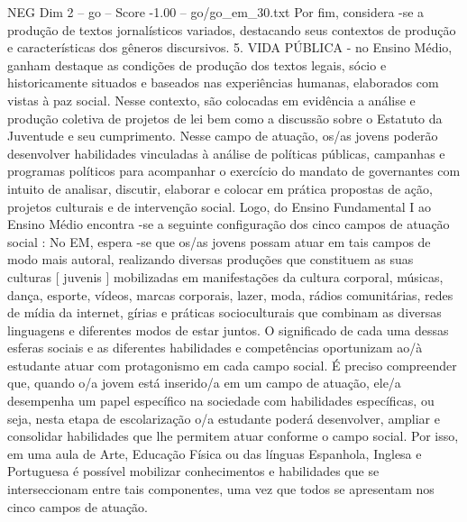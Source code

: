 \begin{textsample}{NEG Dim 2 – go – Score -1.00 – go/go\_em\_30.txt}
Por fim, considera -se a produção de textos jornalísticos variados, destacando seus contextos de produção e características dos gêneros discursivos. 5.
VIDA PÚBLICA - no Ensino Médio, ganham destaque as condições de produção dos textos legais, sócio e historicamente situados e baseados nas experiências humanas, elaborados com vistas à paz social.
Nesse contexto, são colocadas em evidência a análise e produção coletiva de projetos de lei bem como a discussão sobre o Estatuto da Juventude e seu cumprimento.
Nesse campo de atuação, os/as jovens poderão desenvolver habilidades vinculadas à análise de políticas públicas, campanhas e programas políticos para acompanhar o exercício do mandato de governantes com intuito de analisar, discutir, elaborar e colocar em prática propostas de ação, projetos culturais e de intervenção social.
Logo, do Ensino Fundamental I ao Ensino Médio encontra -se a seguinte configuração dos cinco campos de atuação social : No EM, espera -se que os/as jovens possam atuar em tais campos de modo mais autoral, realizando diversas produções que constituem as suas culturas [ juvenis ] mobilizadas em manifestações da cultura corporal, músicas, dança, esporte, vídeos, marcas corporais, lazer, moda, rádios comunitárias, redes de mídia da internet, gírias e práticas socioculturais que combinam as diversas linguagens e diferentes modos de estar juntos.
O significado de cada uma dessas esferas sociais e as diferentes habilidades e competências oportunizam ao/à estudante atuar com protagonismo em cada campo social.
É preciso compreender que, quando o/a jovem está inserido/a em um campo de atuação, ele/a desempenha um papel específico na sociedade com habilidades específicas, ou seja, nesta etapa de escolarização o/a estudante poderá desenvolver, ampliar e consolidar habilidades que lhe permitem atuar conforme o campo social.
Por isso, em uma aula de Arte, Educação Física ou das línguas Espanhola, Inglesa e Portuguesa é possível mobilizar conhecimentos e habilidades que se interseccionam entre tais componentes, uma vez que todos se apresentam nos cinco campos de atuação.

\end{textsample}
